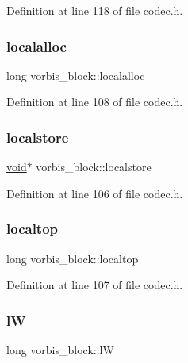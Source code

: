 Definition at line 118 of file codec.\+h.

\mbox{\label{structvorbis__block_a0bf878ef26f578abfd5c7974d8a09f7d}} 
\subsubsection{\texorpdfstring{localalloc}{localalloc}}
{\footnotesize\ttfamily long vorbis\+\_\+block\+::localalloc}



Definition at line 108 of file codec.\+h.

\mbox{\label{structvorbis__block_a457093b574de4317ae1b2505a868a5fb}} 
\subsubsection{\texorpdfstring{localstore}{localstore}}
{\footnotesize\ttfamily \mbox{\hyperlink{_s_d_l__opengles2__gl2ext_8h_ae5d8fa23ad07c48bb609509eae494c95}{void}}$\ast$ vorbis\+\_\+block\+::localstore}



Definition at line 106 of file codec.\+h.

\mbox{\label{structvorbis__block_a5d207139360d9fa6c825ebca553ae984}} 
\subsubsection{\texorpdfstring{localtop}{localtop}}
{\footnotesize\ttfamily long vorbis\+\_\+block\+::localtop}



Definition at line 107 of file codec.\+h.

\mbox{\label{structvorbis__block_a97675088561ed9aa4559e869aafd1f2c}} 
\subsubsection{\texorpdfstring{lW}{lW}}
{\footnotesize\ttfamily long vorbis\+\_\+block\+::lW}



